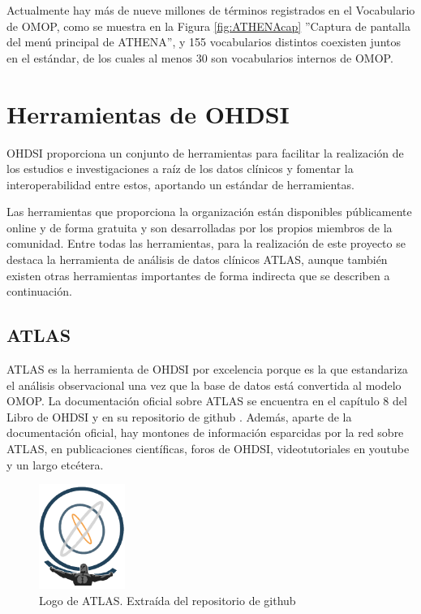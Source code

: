 Actualmente hay más de nueve millones de términos registrados en el Vocabulario de OMOP, como se muestra en la Figura \ref{fig:ATHENAcap} ''Captura de pantalla del menú principal de ATHENA'', y 155 vocabularios distintos coexisten juntos en el estándar, de los cuales al menos 30 son vocabularios internos de OMOP.




\section{Herramientas de OHDSI} \label{sec:07herramientas}

OHDSI proporciona un conjunto de herramientas para facilitar la realización de los estudios e investigaciones a raíz de los datos clínicos y fomentar la interoperabilidad entre estos, aportando un estándar de herramientas. 

Las herramientas que proporciona la organización están disponibles públicamente online y de forma gratuita y son desarrolladas por los propios miembros de la comunidad. Entre todas las herramientas, para la realización de este proyecto se destaca la herramienta de análisis de datos clínicos ATLAS, aunque también existen otras herramientas importantes de forma indirecta que se describen a continuación.

\subsection{ATLAS} \label{subsec:07ATLAS}

ATLAS es la herramienta de OHDSI por excelencia porque es la que estandariza el análisis observacional una vez que la base de datos está convertida al modelo OMOP. La documentación oficial sobre ATLAS se encuentra en el capítulo 8 del Libro de OHDSI y en su repositorio de github \cite{githubATLAS}. Además, aparte de la documentación oficial, hay montones de información esparcidas por la red sobre ATLAS, en publicaciones científicas, foros de OHDSI, videotutoriales en youtube y un largo etcétera.

\begin{figure}[H]
\centering
\includegraphics[width=0.25\textwidth]{figures/ATLASlogo.png}
     \caption{Logo de ATLAS. Extraída del repositorio de github \cite{githubATLAS}}
    \label{fig:ATLASlogo}
\end{figure}

